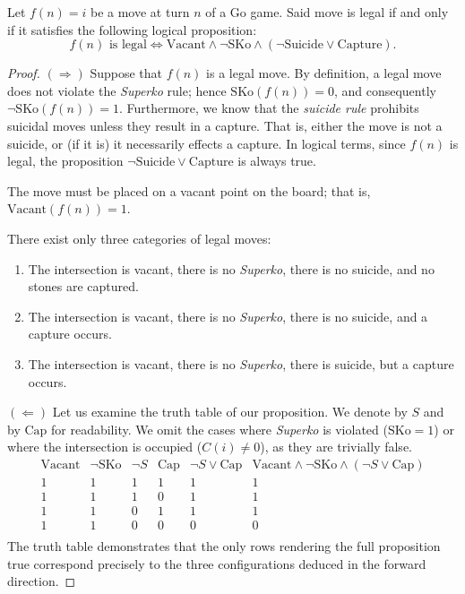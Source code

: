 \begin{theorem}\label{teoremalegal}
	Let \(f(n) = i\) be a move at turn \(n\) of a Go game. Said move is legal if and only if it satisfies the following logical proposition:
	$$f(n) \text{ is legal} \iff \text{Vacant} \wedge \neg \text{SKo} \wedge (\neg \text{Suicide} \vee \text{Capture}).$$
	\end{theorem}

\begin{proof}
	
	\((\Rightarrow)\) Suppose that \(f(n)\) is a legal move.
	By definition, a legal move does not violate the \textit{Superko} rule; hence \(\text{SKo}(f(n))=0\), and consequently \(\neg\text{SKo}(f(n))=1\).
	Furthermore, we know that the \textit{suicide rule} prohibits suicidal moves unless they result in a capture. That is, either the move is not a suicide, or (if it is) it necessarily effects a capture. In logical terms, since \(f(n)\) is legal, the proposition \(\neg\text{Suicide} \vee \text{Capture}\) is always true.
	
	The move must be placed on a vacant point on the board; that is, \(\text{Vacant}(f(n))=1\).
	
	
	There exist only three categories of legal moves:
	\begin{enumerate}
		\item The intersection is vacant, there is no \textit{Superko}, there is no suicide, and no stones are captured.
		\item The intersection is vacant, there is no \textit{Superko}, there is no suicide, and a capture occurs.
		\item The intersection is vacant, there is no \textit{Superko}, there is suicide, but a capture occurs.
	\end{enumerate}
	\((\Leftarrow)\) Let us examine the truth table of our proposition. We denote  by \(S\) and  by \(\text{Cap}\) for readability. We omit the cases where \textit{Superko} is violated (\(\text{SKo}=1\)) or where the intersection is occupied (\(C(i) \neq 0\)), as they are trivially false.
	\[
	\begin{array}{c|c|c|c|c|c}
		\text{Vacant} & \neg \text{SKo} & \neg S & \text{Cap} & \neg S \vee \text{Cap} & \text{Vacant} \wedge \neg \text{SKo} \wedge (\neg S \vee \text{Cap}) \\ 
		\hline 
		1 & 1 & 1 & 1 & 1 & 1 \\
		1 & 1 & 1 & 0 & 1 & 1 \\
		1 & 1 & 0 & 1 & 1 & 1 \\
		1 & 1 & 0 & 0 & 0 & 0 \\
	\end{array}
	\]
	The truth table demonstrates that the only rows rendering the full proposition true correspond precisely to the three configurations deduced in the forward direction.
\end{proof}

